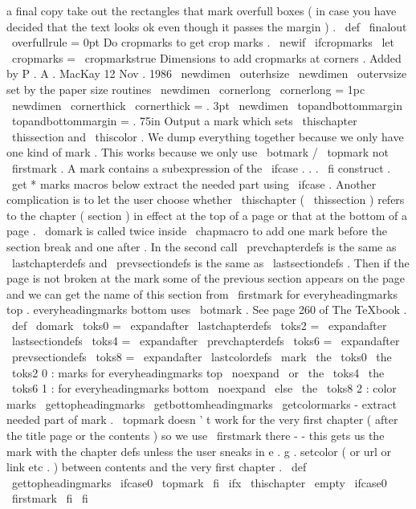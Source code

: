 a
final
copy
take
out
the
rectangles
%
that
mark
overfull
boxes
(
in
case
you
have
decided
%
that
the
text
looks
ok
even
though
it
passes
the
margin
)
.
%
\
def
\
finalout
{
\
overfullrule
=
0pt
}
%
Do
cropmarks
to
get
crop
marks
.
%
\
newif
\
ifcropmarks
\
let
\
cropmarks
=
\
cropmarkstrue
%
%
Dimensions
to
add
cropmarks
at
corners
.
%
Added
by
P
.
A
.
MacKay
12
Nov
.
1986
%
\
newdimen
\
outerhsize
\
newdimen
\
outervsize
%
set
by
the
paper
size
routines
\
newdimen
\
cornerlong
\
cornerlong
=
1pc
\
newdimen
\
cornerthick
\
cornerthick
=
.
3pt
\
newdimen
\
topandbottommargin
\
topandbottommargin
=
.
75in
%
Output
a
mark
which
sets
\
thischapter
\
thissection
and
\
thiscolor
.
%
We
dump
everything
together
because
we
only
have
one
kind
of
mark
.
%
This
works
because
we
only
use
\
botmark
/
\
topmark
not
\
firstmark
.
%
%
A
mark
contains
a
subexpression
of
the
\
ifcase
.
.
.
\
fi
construct
.
%
\
get
*
marks
macros
below
extract
the
needed
part
using
\
ifcase
.
%
%
Another
complication
is
to
let
the
user
choose
whether
\
thischapter
%
(
\
thissection
)
refers
to
the
chapter
(
section
)
in
effect
at
the
top
%
of
a
page
or
that
at
the
bottom
of
a
page
.
%
\
domark
is
called
twice
inside
\
chapmacro
to
add
one
%
mark
before
the
section
break
and
one
after
.
%
In
the
second
call
\
prevchapterdefs
is
the
same
as
\
lastchapterdefs
%
and
\
prevsectiondefs
is
the
same
as
\
lastsectiondefs
.
%
Then
if
the
page
is
not
broken
at
the
mark
some
of
the
previous
%
section
appears
on
the
page
and
we
can
get
the
name
of
this
section
%
from
\
firstmark
for
everyheadingmarks
top
.
%
everyheadingmarks
bottom
uses
\
botmark
.
%
%
See
page
260
of
The
TeXbook
.
\
def
\
domark
{
%
\
toks0
=
\
expandafter
{
\
lastchapterdefs
}
%
\
toks2
=
\
expandafter
{
\
lastsectiondefs
}
%
\
toks4
=
\
expandafter
{
\
prevchapterdefs
}
%
\
toks6
=
\
expandafter
{
\
prevsectiondefs
}
%
\
toks8
=
\
expandafter
{
\
lastcolordefs
}
%
\
mark
{
%
\
the
\
toks0
\
the
\
toks2
%
0
:
marks
for
everyheadingmarks
top
\
noexpand
\
or
\
the
\
toks4
\
the
\
toks6
%
1
:
for
everyheadingmarks
bottom
\
noexpand
\
else
\
the
\
toks8
%
2
:
color
marks
}
%
}
%
\
gettopheadingmarks
\
getbottomheadingmarks
%
\
getcolormarks
-
extract
needed
part
of
mark
.
%
%
\
topmark
doesn
'
t
work
for
the
very
first
chapter
(
after
the
title
%
page
or
the
contents
)
so
we
use
\
firstmark
there
-
-
this
gets
us
%
the
mark
with
the
chapter
defs
unless
the
user
sneaks
in
e
.
g
.
%
setcolor
(
or
url
or
link
etc
.
)
between
contents
and
the
very
%
first
chapter
.
\
def
\
gettopheadingmarks
{
%
\
ifcase0
\
topmark
\
fi
\
ifx
\
thischapter
\
empty
\
ifcase0
\
firstmark
\
fi
\
fi
}
